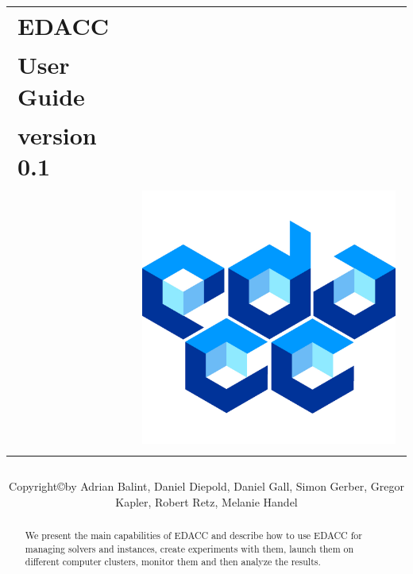 \documentclass[twoside,a4paper]{refart}
\title{
\begin{tabular}{>{\raggedright}m{4cm}>{\raggedleft}m{10cm}}
EDACC \\User Guide \\version 0.1\\ & \includegraphics[scale=0.3]{edacclogo.jpg}
\end{tabular}
}
\author{Copyright\copyright by  Adrian Balint, Daniel Diepold, Daniel Gall, Simon Gerber, Gregor Kapler, Robert Retz, Melanie Handel}
\date{}
\theoremstyle{dotless}
\newcounter{ex}
\newcommand{\Eexample}{\color{green}Example \arabic{ex}:  \addtocounter{ex}{1}}
\begin{document}
\maketitle


\begin{abstract}
        We present the main capabilities of EDACC and describe how to use EDACC for managing solvers and instances, create experiments with them, launch them on different computer clusters, monitor them and then analyze the results. 
\end{abstract}



\tableofcontents

\newpage

\end{document}
